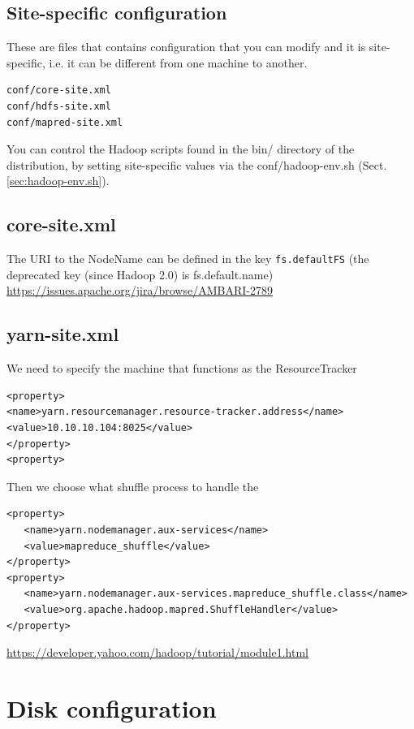\subsection{Site-specific configuration}

These are files that contains configuration that you can modify and it is
site-specific, i.e. it can be different from one machine to another.
\begin{verbatim}
conf/core-site.xml
conf/hdfs-site.xml 
conf/mapred-site.xml
\end{verbatim}

You can control the Hadoop scripts found in the bin/ directory of the
distribution, by setting site-specific values via the conf/hadoop-env.sh
(Sect.\ref{sec:hadoop-env.sh}).

\subsection{core-site.xml}
\label{sec:core-site.xml}

The URI to the NodeName can be defined in the key \verb!fs.defaultFS! (the
deprecated key (since Hadoop 2.0) is fs.default.name)
\url{https://issues.apache.org/jira/browse/AMBARI-2789}


\subsection{yarn-site.xml}
\label{sec:yarn-site.xml}

We need to specify the machine that functions as the ResourceTracker
\begin{verbatim}
<property>
<name>yarn.resourcemanager.resource-tracker.address</name>
<value>10.10.10.104:8025</value>
</property>
<property>
\end{verbatim}

Then we choose what shuffle process to handle the 
\begin{verbatim}
<property>
   <name>yarn.nodemanager.aux-services</name>
   <value>mapreduce_shuffle</value>
</property>
<property>
   <name>yarn.nodemanager.aux-services.mapreduce_shuffle.class</name>
   <value>org.apache.hadoop.mapred.ShuffleHandler</value>
</property>
\end{verbatim}
\url{https://developer.yahoo.com/hadoop/tutorial/module1.html}

\section{Disk configuration}


